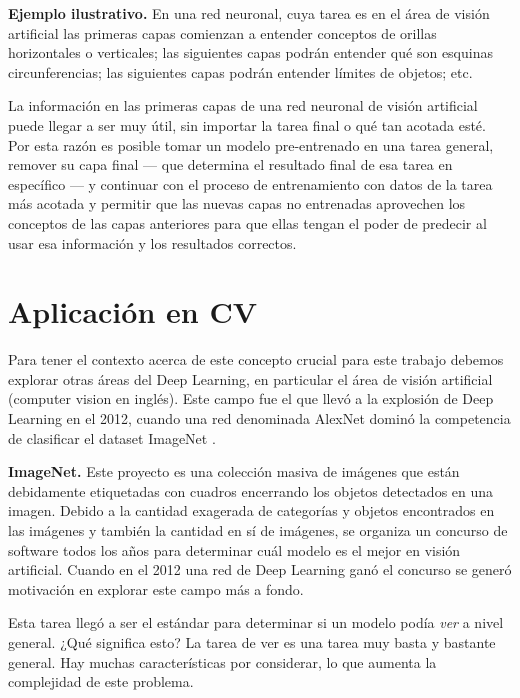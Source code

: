 \textbf{Ejemplo ilustrativo.} En una red neuronal, cuya tarea es en el área de visión artificial las primeras capas comienzan a entender conceptos de orillas horizontales o verticales; las siguientes capas podrán entender qué son esquinas circunferencias; las siguientes capas podrán entender límites de objetos; etc.

La información en las primeras capas de una red neuronal de visión artificial puede llegar a ser muy útil, sin importar la tarea final o qué tan acotada esté. Por esta razón es posible tomar un modelo pre-entrenado en una tarea general, remover su capa final --- que determina el resultado final de esa tarea en específico --- y continuar con el proceso de entrenamiento con datos de la tarea más acotada y permitir que las nuevas capas no entrenadas aprovechen los conceptos de las capas anteriores para que ellas tengan el poder de predecir al usar esa información y los resultados correctos.



\section{Aplicación en CV}
Para tener el contexto acerca de este concepto crucial para este trabajo debemos explorar otras áreas del Deep Learning, en particular el área de visión artificial (computer vision en inglés). Este campo fue el que llevó a la explosión de Deep Learning en el 2012, cuando una red denominada AlexNet dominó la competencia de clasificar el dataset ImageNet \parencite{deng2009imagenet}.

\textbf{ImageNet.} Este proyecto es una colección masiva de imágenes que están debidamente etiquetadas con cuadros encerrando los objetos detectados en una imagen. Debido a la cantidad exagerada de categorías y objetos encontrados en las imágenes y también la cantidad en sí de imágenes, se organiza un concurso de software todos los años para determinar cuál modelo es el mejor en visión artificial. Cuando en el 2012 una red de Deep Learning ganó el concurso se generó motivación en explorar este campo más a fondo.

Esta tarea llegó a ser el estándar para determinar si un modelo podía \emph{ver} a nivel general. ¿Qué significa esto? La tarea de ver es una tarea muy basta y bastante general. Hay muchas características por considerar, lo que aumenta la complejidad de este problema.



